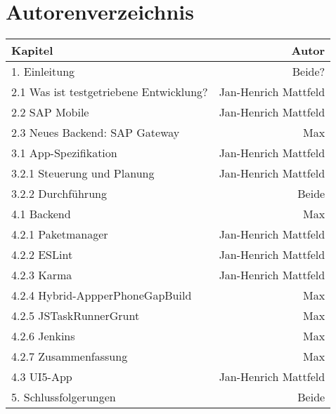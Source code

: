 
\chapter{Autorenverzeichnis}

\begin{tabular}{lr}
	\toprule Kapitel & Autor\\
	\midrule 
	1. Einleitung & Beide?\\
	\midrule 
	2.1 Was ist testgetriebene Entwicklung? & Jan-Henrich Mattfeld\\
	2.2 SAP Mobile & Jan-Henrich Mattfeld\\
	2.3 Neues Backend: SAP Gateway & Max\\
	\midrule 
	3.1 App-Spezifikation & Jan-Henrich Mattfeld \\	 
	3.2.1 Steuerung und Planung & Jan-Henrich Mattfeld\\
	3.2.2 Durchführung & Beide\\
	\midrule 
	4.1 Backend & Max \\
	4.2.1 Paketmanager & Jan-Henrich Mattfeld\\
	4.2.2 ESLint & Jan-Henrich Mattfeld\\
	4.2.3 Karma & Jan-Henrich Mattfeld\\
	4.2.4 Hybrid-AppperPhoneGapBuild & Max\\
	4.2.5 JSTaskRunnerGrunt & Max\\
	4.2.6 Jenkins & Max\\
	4.2.7 Zusammenfassung & Max\\
	4.3 UI5-App & Jan-Henrich Mattfeld \\
	\midrule 
	5. Schlussfolgerungen & Beide \\
	\bottomrule 
\end{tabular}